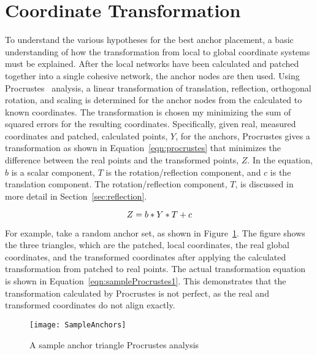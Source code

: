 \section{Coordinate Transformation} \label{sec:procrustes}
To understand the various hypotheses for the best anchor placement, a basic understanding of how the transformation from local to global coordinate systems must be explained.  After the local networks have been calculated and patched together into a single cohesive network, the anchor nodes are then used. Using Procrustes~\cite{procrustes-matlab} analysis, a linear transformation of translation, reflection, orthogonal rotation, and scaling is determined for the anchor nodes from the calculated to known coordinates. The transformation is chosen my minimizing the sum of squared errors for the resulting coordinates.  Specifically, given real, measured coordinates and patched, calculated points, $Y$, for the anchors, Procrustes gives a transformation as shown in Equation~\ref{eqn:procrustes} that minimizes the difference between the real points and the transformed points, $Z$.  In the equation, $b$ is a scalar component, $T$ is the rotation/reflection component, and $c$ is the translation component.  The rotation/reflection component, $T$, is discussed in more detail in Section~\ref{sec:reflection}.

\begin{equation}\label{eqn:procrustes}
Z = b*Y*T + c \\
\end{equation}

For example, take a random anchor set, as shown in Figure~\ref{fig:sampleProcrustes1}.  The figure shows the three triangles, which are the patched, local coordinates, the real global coordinates, and the transformed coordinates after applying the calculated transformation from patched to real points.  The actual transformation equation is shown in Equation~\ref{eqn:sampleProcrustes1}.  This demonstrates that the transformation calculated by Procrustes is not perfect, as the real and transformed coordinates do not align exactly.

\begin{figure}
	\centering
		\texttt{[image: SampleAnchors]}
	\caption{A sample anchor triangle Procrustes analysis}
	\label{fig:sampleProcrustes1}
\end{figure}

